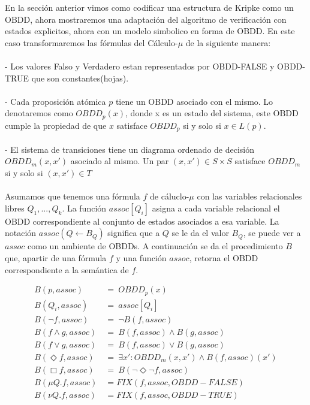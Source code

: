 En la sección anterior vimos como codificar una estructura de Kripke como un OBDD, ahora mostraremos una adaptación del algoritmo de verificación con estados explicitos, ahora con un modelo simbolico en forma de OBDD. En este caso transformaremos las fórmulas del Cálculo-$\mu$ de la siguiente manera\cite{Clarke:1}: \\
\\
- Los valores Falso y Verdadero estan representados por OBDD-FALSE y OBDD-TRUE que son constantes(hojas).\\
\\
- Cada proposición atómica $p$ tiene un OBDD asociado con el mismo. Lo denotaremos como $OBDD_{p}(x)$, donde x es un estado del sistema, este OBDD cumple la propiedad de que $x$ satisface $OBDD_{p}$ si y solo si $x \in L(p)$. \\
\\
- El sistema de transiciones tiene un diagrama ordenado de decisión $OBDD_{m}(x,x')$ asociado al mismo. Un par $(x,x') \in S \times S$ satisface $OBDD_{m}$ si y solo si $(x,x') \in T$ \\
\\
Asumamos que tenemos una fórmula $f$ de cáluclo-$\mu$ con las variables relacionales libres $Q_{1},...,Q_{k}$. La función $assoc[Q_{i}]$ asigna a cada variable relacional el OBDD correspondiente al conjunto de estados asociados a esa variable. La notación $assoc(Q \gets B_{Q})$ significa que a $Q$ se le da el valor $B_{Q}$, se puede ver a $assoc$ como un ambiente de OBDDs. A continuación se da el procedimiento $B$ que, apartir de una fórmula $f$ y una función $assoc$, retorna el OBDD correspondiente a la semántica de $f$.

\begin{align*}
 B(p,assoc)\ &=\ OBDD_{p}(x) \\
 B(Q_{i},assoc)\ &=\ assoc[Q_{i}] \\
 B(\neg f,assoc)\ &=\ \neg B(f,assoc) \\
 B(f \land g,assoc)\ &=\ B(f,assoc) \land B(g,assoc) \\
 B(f \lor g,assoc)\ &=\ B(f,assoc) \lor B(g,assoc) \\
 B(\Diamond f,assoc)\ &=\ \exists x' : OBDD_{m}(x,x') \land B(f,assoc)(x') \\
 B(\Box f,assoc)\ &=\ B(\neg \Diamond \neg f, assoc) \\
 B(\mu Q. f, assoc) &= FIX(f,assoc,OBDD-FALSE) \\
 B(\nu Q. f, assoc) &= FIX(f,assoc,OBDD-TRUE) \\
\end{align*}

